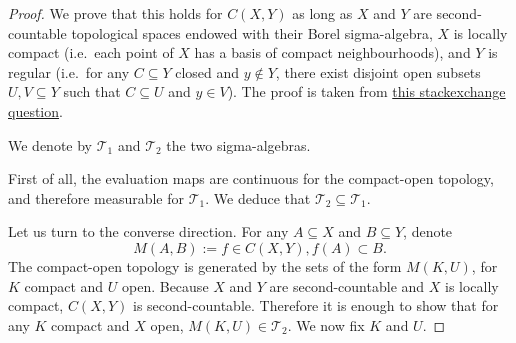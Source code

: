 \begin{proof}\leanok
We prove that this holds for $C(X, Y)$ as long as $X$ and $Y$ are second-countable topological spaces endowed with their Borel sigma-algebra, $X$ is locally compact (i.e.\ each point of $X$ has a basis of compact neighbourhoods), and $Y$ is regular (i.e.\ for any $C \subseteq Y$ closed and $y \notin Y$, there exist disjoint open subsets $U, V \subseteq Y$ such that $C \subseteq U$ and $y \in V$). The proof is taken from \href{https://math.stackexchange.com/questions/4789531/when-does-the-borel-sigma-algebra-of-compact-convergence-coincide-with-the-pr}{this stackexchange question}.

We denote by $\mathcal{T}_1$ and $\mathcal{T}_2$ the two sigma-algebras.

First of all, the evaluation maps are continuous for the compact-open topology, and therefore measurable for $\mathcal{T}_1$. We deduce that $\mathcal{T}_2 \subseteq \mathcal{T}_1$.

Let us turn to the converse direction. For any $A \subseteq X$ and $B \subseteq Y$, denote
$$M(A, B) := {f \in C(X, Y), f(A) \subset B}.$$
The compact-open topology is generated by the sets of the form $M(K, U)$, for $K$ compact and $U$ open. Because $X$ and $Y$ are second-countable and $X$ is locally compact, $C(X, Y)$ is second-countable. Therefore it is enough to show that for any $K$ compact and $X$ open, $M(K, U) \in \mathcal{T}_2$. We now fix $K$ and $U$.


\end{proof}
